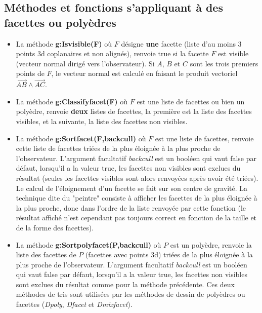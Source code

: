 \documentclass[%
10pt,%
a4paper,%
french,%
]%
{article}%
\begin{document}
\subsection{Méthodes et fonctions s'appliquant à des facettes ou polyèdres}

\begin{itemize}
    \item La méthode \textbf{g:Isvisible(F)} où $F$ désigne \textbf{une} facette (liste d'au moins 3 points 3d coplanaires et non alignés), renvoie true si la facette $F$ est visible (vecteur normal dirigé vers l'observateur). Si $A$, $B$ et $C$ sont les trois premiers points de $F$, le vecteur normal est calculé en faisant le produit vectoriel $\vec{AB}\wedge\vec{AC}$.
    
    \item La méthode \textbf{g:Classifyfacet(F)} où $F$ est une liste de facettes ou bien un polyèdre, renvoie \textbf{deux} listes de facettes, la première est la liste des facettes visibles, et la suivante, la liste des facettes non visibles.
    
    \item La méthode \textbf{g:Sortfacet(F,backcull)} où $F$ est une liste de facettes, renvoie cette liste de facettes triées de la plus éloignée à la plus proche de l'observateur. L'argument facultatif \emph{backcull} est un booléen qui vaut false par défaut, lorsqu'il a la valeur true, les facettes non visibles sont exclues du résultat (seules les facettes visibles sont alors renvoyées après avoir été triées). Le calcul de l'éloignement d'un facette se fait sur son centre de gravité. La technique dite du "peintre" consiste à afficher les facettes de la plus éloignée à la plus proche, donc dans l'ordre de la liste renvoyée par cette fonction (le résultat affiché n'est cependant pas toujours correct en fonction de la taille et de la forme des facettes).
    
    \item La méthode \textbf{g:Sortpolyfacet(P,backcull)} où $P$ est un polyèdre, renvoie la liste des facettes de $P$ (facettes avec points 3d) triées de la plus éloignée à la plus proche de l'observateur. L'argument facultatif \emph{backcull} est un booléen qui vaut false par défaut, lorsqu'il a la valeur true, les facettes non visibles sont exclues du résultat comme pour la méthode précédente. Ces deux méthodes de tris sont utilisées par les méthodes de dessin de polyèdres ou facettes (\emph{Dpoly}, \emph{Dfacet} et \emph{Dmixfacet}).
    

\end{itemize}
\end{document}

